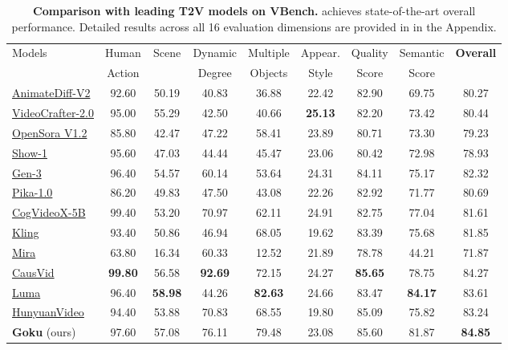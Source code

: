 \begin{table}[t]
    \centering
    \begin{tabular}{lcccccccc}
   \toprule
        \multirow{2}{*}{Models} & Human  & \multirow{2}{*}{Scene} &  Dynamic  & Multiple  & Appear.  & Quality & Semantic & \multirow{2}{*}{\textbf{Overall}}  \\ 
         & Action &  & Degree & Objects & Style  & Score & Score &  \\
        \midrule
\href{https://github.com/guoyww/AnimateDiff}{AnimateDiff-V2} & 92.60 & 50.19 & 40.83 & 36.88 & 22.42 & 82.90 & 69.75 & 80.27 \\
\href{https://github.com/AILab-CVC/VideoCrafter}{VideoCrafter-2.0} & 95.00 & 55.29 & 42.50 & 40.66 & \textbf{25.13} & 82.20 & 73.42 & 80.44 \\
\href{https://huggingface.co/hpcai-tech/OpenSora-STDiT-v3}{OpenSora V1.2} & 85.80 & 42.47 & 47.22 & 58.41 & 23.89 & 80.71 & 73.30 & 79.23 \\
\href{https://github.com/showlab/Show-1}{Show-1} & 95.60 & 47.03 & 44.44 & 45.47 & 23.06 & 80.42 & 72.98 & 78.93 \\
\href{https://runwayml.com/research/introducing-gen-3-alpha}{Gen-3} & 96.40 & 54.57 & 60.14 & 53.64 & 24.31 & 84.11 & 75.17 & 82.32 \\
\href{https://pika.art}{Pika-1.0} & 86.20 & 49.83 & 47.50 & 43.08 & 22.26 & 82.92 & 71.77 & 80.69 \\
\href{https://github.com/THUDM/CogVideo}{CogVideoX-5B} & 99.40 & 53.20 & 70.97 & 62.11 & 24.91 & 82.75 & 77.04 & 81.61 \\
\href{https://klingai.kuaishou.com/}{Kling} & 93.40 & 50.86 & 46.94 & 68.05 & 19.62 & 83.39 & 75.68 & 81.85 \\
\href{https://github.com/mira-space/Mira}{Mira} & 63.80 & 16.34 & 60.33 & 12.52 & 21.89 & 78.78 & 44.21 & 71.87 \\
\href{https://causvid.github.io/}{CausVid} & \textbf{99.80} & 56.58 & \textbf{92.69} & 72.15 & 24.27 & \textbf{85.65} & 78.75 & 84.27 \\
\href{https://lumalabs.ai/dream-machine}{Luma} & 96.40 & \textbf{58.98} & 44.26 & \textbf{82.63} & 24.66 & 83.47 & \textbf{84.17} & 83.61 \\
\href{https://github.com/Tencent/HunyuanVideo}{HunyuanVideo} & 94.40 & 53.88 & 70.83 & 68.55 & 19.80 & 85.09 & 75.82 & 83.24 \\
\midrule
\textbf{Goku} (ours) & 97.60 & 57.08 & 76.11 & 79.48 & 23.08 & 85.60 & 81.87 & \textbf{84.85} \\
\bottomrule
    \end{tabular}
    \caption{\textbf{Comparison with leading T2V models on VBench.} \ours achieves state-of-the-art overall performance. Detailed results across all 16 evaluation dimensions are provided in  in the Appendix.}\label{tab:vbench-mini}
\end{table}

